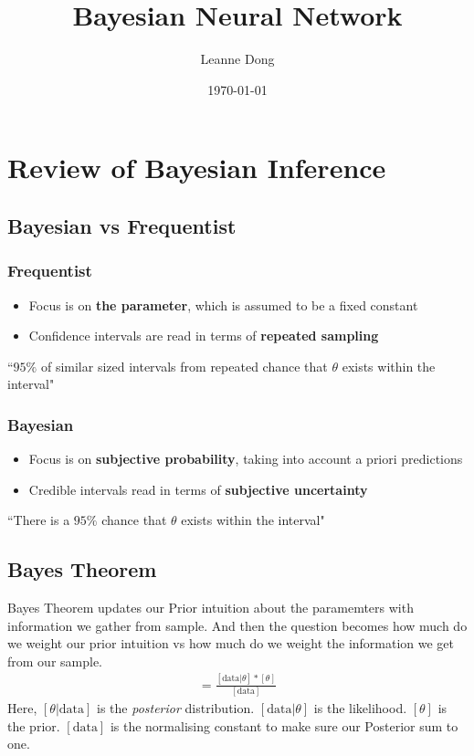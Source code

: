 \documentclass[11pt, oneside, reqno]{amsart}
\title{Bayesian Neural Network}
\author{Leanne Dong}
\date{\today}
\numberwithin{equation}{section}
\theoremstyle{plain}%
\theoremstyle{definition}
\theoremstyle{remark}
\begin{document}
	\maketitle
	
\section{Review of Bayesian Inference}
\subsection{Bayesian vs Frequentist}
\subsubsection{Frequentist}
\begin{itemize}
	\item Focus is on \textbf{the parameter}, which is assumed to be a fixed constant 
	\item Confidence intervals are read in terms of \textbf{repeated sampling}
\end{itemize}
``$95\%$ of similar sized intervals from repeated 
chance that $\theta$ exists within the interval"
\subsubsection{Bayesian}
\begin{itemize}
	\item Focus is on \textbf{subjective probability}, taking into account a priori predictions
	\item Credible intervals read in terms of \textbf{subjective uncertainty}
\end{itemize}

``There is a $95\%$ chance that $\theta$ exists within the interval"

\subsection{Bayes Theorem}
Bayes Theorem updates our Prior intuition about the paramemters with information we gather from sample. And then the question becomes how much do we weight our prior intuition vs how much do we weight the information we get from our sample. 
\begin{align*}
	[\theta|\text{data}]=\frac{[\text{data}|\theta]*[\theta]}{[\text{data}]}
\end{align*}
Here, $[\theta|\text{data}]$ is the \emph{posterior}  distribution. $[\text{data}|\theta]$ is the likelihood. $[\theta]$ is the prior. $[\text{data}]$ is the normalising constant to make sure our Posterior sum to one.
\end{document}
